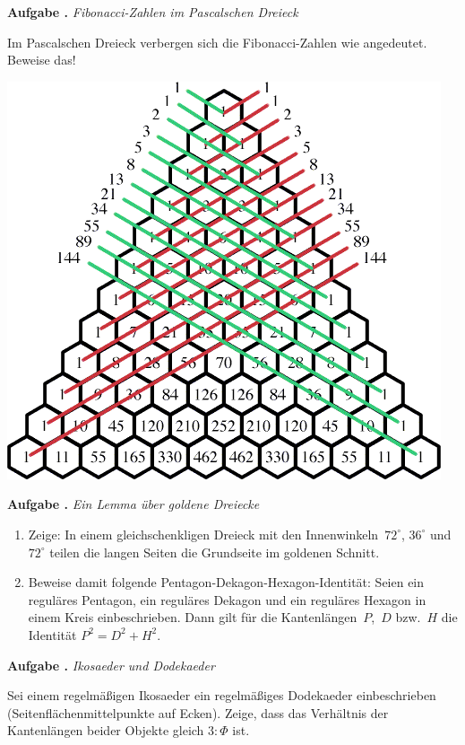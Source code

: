 \documentclass[a4paper,ngerman,twoside]{scrartcl}
\newlength{\aufgabenskip}
\newcounter{aufgabennummer}
\newenvironment{aufgabe}[1]{
  \addtocounter{aufgabennummer}{1}
  \textbf{Aufgabe \theaufgabennummer.} \emph{#1} \par
}{\vspace{\aufgabenskip}}
\begin{document}
\begin{aufgabe}{Fibonacci-Zahlen im Pascalschen Dreieck}
Im Pascalschen Dreieck verbergen sich die Fibonacci-Zahlen wie angedeutet.
Beweise das!
\begin{center}
\includegraphics[scale=0.5]{pascal-fibonacci}
\end{center}
\end{aufgabe}

\begin{aufgabe}{Ein Lemma über goldene Dreiecke}
\begin{enumerate}
\item Zeige: In einem gleichschenkligen Dreieck mit den
Innenwinkeln~$72^\circ$, $36^\circ$ und~$72^\circ$ teilen die langen Seiten die
Grundseite im goldenen Schnitt.
\item Beweise damit folgende Pentagon-Dekagon-Hexagon-Identität: Seien ein
reguläres Pentagon, ein reguläres Dekagon und ein reguläres Hexagon in einem
Kreis einbeschrieben. Dann gilt für die Kantenlängen~$P$,~$D$ bzw.~$H$ die
Identität $P^2 = D^2 + H^2$.
\end{enumerate}
\end{aufgabe}

\begin{aufgabe}{Ikosaeder und Dodekaeder}
Sei einem regelmäßigen Ikosaeder ein regelmäßiges Dodekaeder einbeschrieben
(Seitenflächenmittelpunkte auf Ecken). Zeige, dass das Verhältnis der Kantenlängen
beider Objekte gleich $3:\Phi$ ist.
\end{aufgabe}
\end{document}
